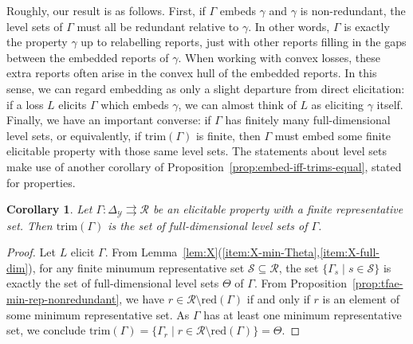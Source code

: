 \documentclass[11pt]{article}
\newcommand{\simplex}{\Delta_\Y}
\newcommand{\R}{\mathcal{R}}
\newcommand{\Sc}{\mathcal{S}}
\newcommand{\Y}{\mathcal{Y}}
\newcommand{\toto}{\rightrightarrows}
\newcommand{\red}{\mathrm{red}}
\newcommand{\trimred}{\mathrm{trim}}
\newtheorem{corollary}{Corollary}
\begin{document}
Roughly, our result is as follows.
First, if $\Gamma$ embeds $\gamma$ and $\gamma$ is non-redundant, the level sets of $\Gamma$ must all be redundant relative to $\gamma$.
In other words, $\Gamma$ is exactly the property $\gamma$ up to relabelling reports, just with other reports filling in the gaps between the embedded reports of $\gamma$.
When working with convex losses, these extra reports often arise in the convex hull of the embedded reports.
In this sense, we can regard embedding as only a slight departure from direct elicitation: if a loss $L$ elicits $\Gamma$ which embeds $\gamma$, we can almost think of $L$ as eliciting $\gamma$ itself.
Finally, we have an important converse: if $\Gamma$ has finitely many full-dimensional level sets, or equivalently, if $\trimred(\Gamma)$ is finite, then $\Gamma$ must embed some finite elicitable property with those same level sets.
The statements about level sets make use of another corollary of Proposition~\ref{prop:embed-iff-trims-equal}, stated for properties.
\begin{corollary}\label{cor:trim-prop-red}
  Let $\Gamma : \simplex \toto \R$ be an elicitable property with a finite representative set.
  Then $\trimred(\Gamma)$ is the set of full-dimensional level sets of $\Gamma$.
\end{corollary}
\begin{proof}
  Let $L$ elicit $\Gamma$.
  From Lemma~\ref{lem:X}(\ref{item:X-min-Theta},\ref{item:X-full-dim}), for any finite minumum representative set $\Sc\subseteq\R$, the set $\{\Gamma_s\mid s\in\Sc\}$ is exactly the set of full-dimensional level sets $\Theta$ of $\Gamma$.
  From Proposition~\ref{prop:tfae-min-rep-nonredundant}, we have $r \in \R\setminus \red(\Gamma)$ if and only if $r$ is an element of some minimum representative set.
  As $\Gamma$ has at least one minimum representative set, we conclude $\trimred(\Gamma) = \{\Gamma_r \mid r\in \R\setminus\red(\Gamma)\} = \Theta$.  
\end{proof}
\end{document}
